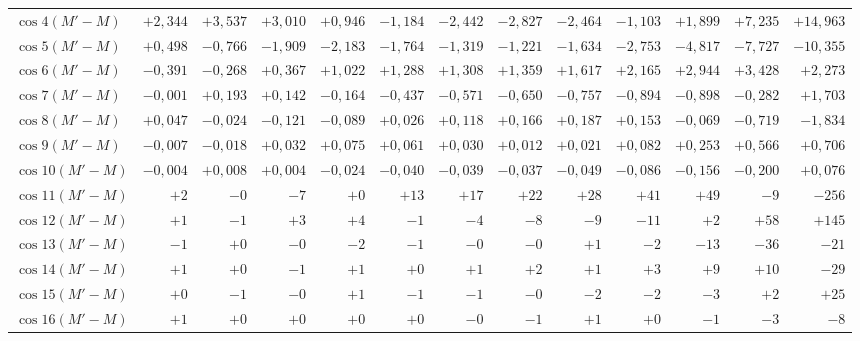 \begin{landscape}
\begin{longtable}{@{}l|r|r|r|r|r|r|r|r|r|r|r|r@{}}
\(\cos 4(M'-M)\) & \(+2{,}344\) & \(+3{,}537\) & \(+3{,}010\) & \(+0{,}946\) & \(-1{,}184\) & \(-2{,}442\) & \(-2{,}827\) & \(-2{,}464\) & \(-1{,}103\) & \(+1{,}899\) & \(+7{,}235\) & \(+14{,}963\)\\
\(\cos 5(M'-M)\) & \(+0{,}498\) & \(-0{,}766\) & \(-1{,}909\) & \(-2{,}183\) & \(-1{,}764\) & \(-1{,}319\) & \(-1{,}221\) & \(-1{,}634\) & \(-2{,}753\) & \(-4{,}817\) & \(-7{,}727\) & \(-10{,}355\)\\
\(\cos 6(M'-M)\) & \(-0{,}391\) & \(-0{,}268\) & \(+0{,}367\) & \(+1{,}022\) & \(+1{,}288\) & \(+1{,}308\) & \(+1{,}359\) & \(+1{,}617\) & \(+2{,}165\) & \(+2{,}944\) & \(+3{,}428\) & \(+2{,}273\)\\
\(\cos 7(M'-M)\) & \(-0{,}001\) & \(+0{,}193\) & \(+0{,}142\) & \(-0{,}164\) & \(-0{,}437\) & \(-0{,}571\) & \(-0{,}650\) & \(-0{,}757\) & \(-0{,}894\) & \(-0{,}898\) & \(-0{,}282\) & \(+1{,}703\)\\
\(\cos 8(M'-M)\) & \(+0{,}047\) & \(-0{,}024\) & \(-0{,}121\) & \(-0{,}089\) & \(+0{,}026\) & \(+0{,}118\) & \(+0{,}166\) & \(+0{,}187\) & \(+0{,}153\) & \(-0{,}069\) & \(-0{,}719\) & \(-1{,}834\)\\
\(\cos 9(M'-M)\) & \(-0{,}007\) & \(-0{,}018\) & \(+0{,}032\) & \(+0{,}075\) & \(+0{,}061\) & \(+0{,}030\) & \(+0{,}012\) & \(+0{,}021\) & \(+0{,}082\) & \(+0{,}253\) & \(+0{,}566\) & \(+0{,}706\)\\
\(\cos 10(M'-M)\) & \(-0{,}004\) & \(+0{,}008\) & \(+0{,}004\) & \(-0{,}024\) & \(-0{,}040\) & \(-0{,}039\) & \(-0{,}037\) & \(-0{,}049\) & \(-0{,}086\) & \(-0{,}156\) & \(-0{,}200\) & \(+0{,}076\)\\
\(\cos 11(M'-M)\) & \(+2\) & \(-0\) & \(-7\) & \(+0\) & \(+13\) & \(+17\) & \(+22\) & \(+28\) & \(+41\) & \(+49\) & \(-9\) & \(-256\)\\
\(\cos 12(M'-M)\) & \(+1\) & \(-1\) & \(+3\) & \(+4\) & \(-1\) & \(-4\) & \(-8\) & \(-9\) & \(-11\) & \(+2\) & \(+58\) & \(+145\)\\
\(\cos 13(M'-M)\) & \(-1\) & \(+0\) & \(-0\) & \(-2\) & \(-1\) & \(-0\) & \(-0\) & \(+1\) & \(-2\) & \(-13\) & \(-36\) & \(-21\)\\
\(\cos 14(M'-M)\) & \(+1\) & \(+0\) & \(-1\) & \(+1\) & \(+0\) & \(+1\) & \(+2\) & \(+1\) & \(+3\) & \(+9\) & \(+10\) & \(-29\)\\
\(\cos 15(M'-M)\) & \(+0\) & \(-1\) & \(-0\) & \(+1\) & \(-1\) & \(-1\) & \(-0\) & \(-2\) & \(-2\) & \(-3\) & \(+2\) & \(+25\)\\
\(\cos 16(M'-M)\) & \(+1\) & \(+0\) & \(+0\) & \(+0\) & \(+0\) & \(-0\) & \(-1\) & \(+1\) & \(+0\) & \(-1\) & \(-3\) & \(-8\)\\

\end{longtable}
\end{landscape}
